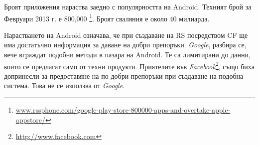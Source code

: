 			Броят приложения нараства заедно с популярността на Android. Техният брой за Февруари 2013 г. е 800,000 \footnote{\url{www.rssphone.com/google-play-store-800000-apps-and-overtake-apple-appstore/}}. Броят сваляния е около 40 милиарда.
			
			Нарастването на Android означава, че при създаване на \ac{RS} посредством \ac{CF} ще има достатъчно информация за даване на добри препоръки. \emph{Google}, разбира се, вече вграждат подобни методи в пазара на Android. Те са лимитирани до данни, които се предлагат само от техни продукти. Приятелите във \emph{Facebook}\footnote{\url{http://www.facebook.com}}, също биха допринесли за предоставяне на по-добри препоръки при създаване на подобна система. Това не се използва от \emph{Google}.
